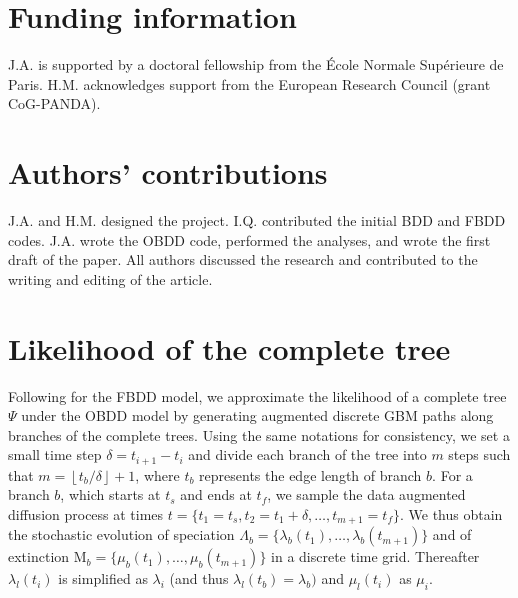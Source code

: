\documentclass[oupdraft]{sysbio}
\begin{document}
\section{Funding information}

J.A. is supported by a doctoral fellowship from the École Normale Supérieure de Paris. H.M. acknowledges support from the European Research Council (grant CoG-PANDA).

\section{Authors' contributions}

J.A. and H.M. designed the project. I.Q. contributed the initial BDD and FBDD codes. J.A. wrote the OBDD code, performed the analyses, and wrote the first draft of the paper. All authors discussed the research and contributed to the writing and editing of the article.


\clearpage


{
  \singlespacing
  \setlength{\parskip}{0pt}
}

\clearpage

\markboth{}{}            %
\appendix
{}  %

\setcounter{figure}{0}

\section{Likelihood of the complete tree} \label{SM-likelihood}

Following \citet{quintero_rise_2025} for the FBDD model, we approximate the likelihood of a complete tree $\Psi$ under the OBDD model by generating augmented discrete GBM paths along branches of the complete trees.
Using the same notations for consistency, we set a small time step $\delta = t_{i+1} - t_{i}$ and divide each branch of the tree into $m$ steps such that $m = \left \lfloor{t_b / \delta}\right \rfloor + 1$, where $t_b$ represents the edge length of branch $b$.
For a branch $b$, which starts at $t_s$ and ends at $t_f$, we sample the data augmented diffusion process at times $t = \{t_1 = t_s, t_2 = t_1 + \delta, \dots, t_{m+1} = t_f\}$. We thus obtain the stochastic evolution of speciation $\Lambda_b = \{\lambda_b(t_1), \dots, \lambda_b(t_{m+1})\}$ and of extinction $\text{M}_b = \{\mu_b(t_1), \dots, \mu_b(t_{m+1})\}$ in a discrete time grid.
Thereafter $\lambda_l(t_i)$ is simplified as $\lambda_i$ (and thus $\lambda_l(t_b) = \lambda_b)$ and $\mu_l(t_i)$ as $\mu_i$.
\end{document}
